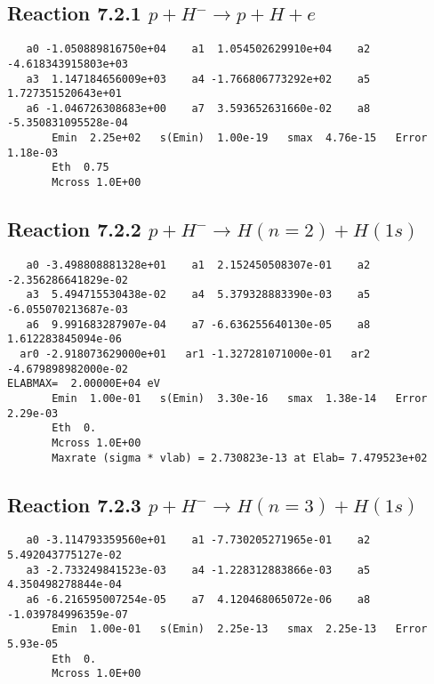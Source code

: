 \documentclass[12pt,dvipdfm]{article}
\begin{document}
\newpage
\subsection{
Reaction 7.2.1 $   p + H^- \rightarrow p + H + e$}


\begin{small}\begin{verbatim}
   a0 -1.050889816750e+04    a1  1.054502629910e+04    a2 -4.618343915803e+03
   a3  1.147184656009e+03    a4 -1.766806773292e+02    a5  1.727351520643e+01
   a6 -1.046726308683e+00    a7  3.593652631660e-02    a8 -5.350831095528e-04
       Emin  2.25e+02   s(Emin)  1.00e-19   smax  4.76e-15   Error  1.18e-03
       Eth  0.75
       Mcross 1.0E+00
\end{verbatim}\end{small}

\newpage
\subsection{
Reaction 7.2.2 $   p + H^- \rightarrow H(n=2) + H(1s)$}


\begin{small}\begin{verbatim}
   a0 -3.498808881328e+01    a1  2.152450508307e-01    a2 -2.356286641829e-02
   a3  5.494715530438e-02    a4  5.379328883390e-03    a5 -6.055070213687e-03
   a6  9.991683287907e-04    a7 -6.636255640130e-05    a8  1.612283845094e-06
  ar0 -2.918073629000e+01   ar1 -1.327281071000e-01   ar2 -4.679898982000e-02
ELABMAX=  2.00000E+04 eV
       Emin  1.00e-01   s(Emin)  3.30e-16   smax  1.38e-14   Error  2.29e-03
       Eth  0.
       Mcross 1.0E+00
       Maxrate (sigma * vlab) = 2.730823e-13 at Elab= 7.479523e+02
\end{verbatim}\end{small}








\newpage
\subsection{
Reaction 7.2.3 $   p + H^- \rightarrow H(n=3) + H(1s)$}


\begin{small}\begin{verbatim}
   a0 -3.114793359560e+01    a1 -7.730205271965e-01    a2  5.492043775127e-02
   a3 -2.733249841523e-03    a4 -1.228312883866e-03    a5  4.350498278844e-04
   a6 -6.216595007254e-05    a7  4.120468065072e-06    a8 -1.039784996359e-07
       Emin  1.00e-01   s(Emin)  2.25e-13   smax  2.25e-13   Error  5.93e-05
       Eth  0.
       Mcross 1.0E+00
\end{verbatim}\end{small}
\end{document}
